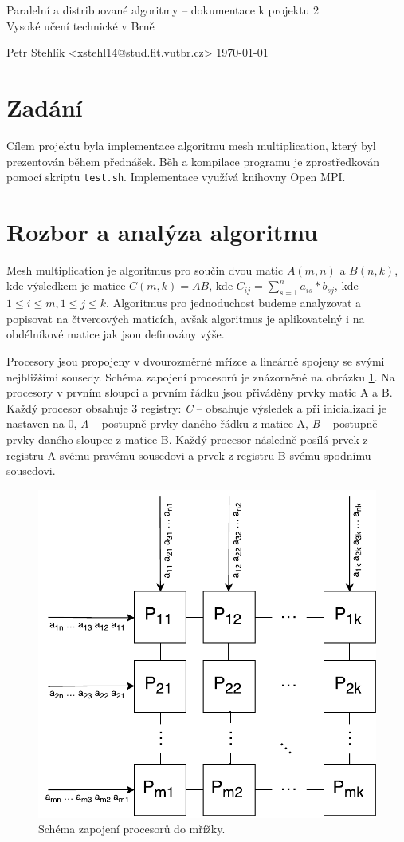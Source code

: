 \documentclass[11pt,a4paper]{article}
\begin{document}
\begin{center}
	\LARGE{Paralelní a distribuované algoritmy -- dokumentace k projektu 2}\\
	\large{Vysoké učení technické v Brně}
	\vspace{0.2cm}

	Petr Stehlík <xstehl14@stud.fit.vutbr.cz>     \today

\end{center}

\section{Zadání}

Cílem projektu byla implementace algoritmu mesh multiplication, který byl prezentován během přednášek. Běh a kompilace programu je zprostředkován pomocí skriptu \texttt{test.sh}. Implementace využívá knihovny Open MPI.

\section{Rozbor a analýza algoritmu}

Mesh multiplication je algoritmus pro součin dvou matic $A(m,n)$ a $B(n,k)$, kde výsledkem je matice $C (m,k) = AB$, kde $C_{ij} = \sum\limits_{s=1}^n a_{is} * b_{sj}$, kde $1 \leq i \leq m, 1 \leq j \leq k$. Algoritmus pro jednoduchost budeme analyzovat a popisovat na čtvercových maticích, avšak algoritmus je aplikovatelný i na obdélníkové matice jak jsou definovány výše.

Procesory jsou propojeny v dvourozměrné mřízce a lineárně spojeny se svými nejbližšími sousedy. Schéma zapojení procesorů je znázorněné na obrázku \ref{schema}. Na procesory v prvním sloupci a prvním řádku jsou přiváděny prvky matic A a B. Každý procesor obsahuje 3 registry: \textit{C} -- obsahuje výsledek a při inicializaci je nastaven na $0$, \textit{A} -- postupně prvky daného řádku z matice A, \textit{B} -- postupně prvky daného sloupce z matice B. Každý procesor následně posílá prvek z registru A svému pravému sousedovi a prvek z registru B svému spodnímu sousedovi.

\begin{figure}[h]
    \includegraphics[width=0.4\linewidth]{mesh}
    \centering
	\caption{Schéma zapojení procesorů do mřížky.}
    \label{schema}
\end{figure}
\end{document}
